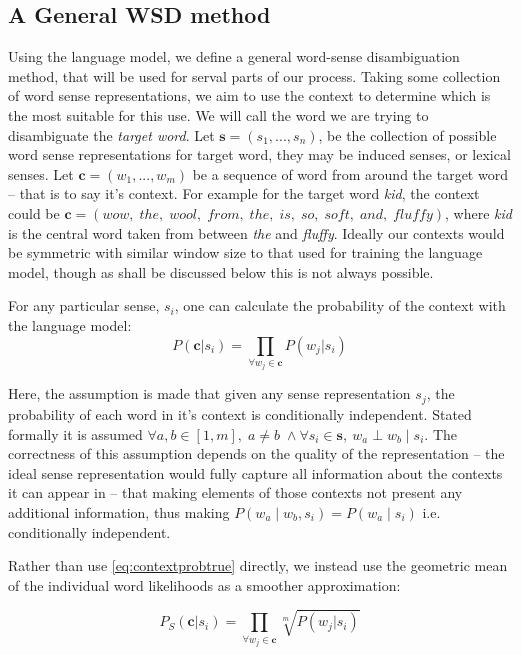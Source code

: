 \documentclass{sig-alternate}
\renewcommand{\c}{\mathbf{c}}
\begin{document}
\subsection{A General WSD method}
Using the language model, we define a general word-sense disambiguation method, that will be used for serval parts of our process.
Taking some collection of word sense representations, we aim to use the context to determine which is the most suitable for this use.
We will call the word we are trying to disambiguate the \emph{target word}.
Let $\mathbf{s}=(s_{1},...,s_{n})$, be the collection of possible word sense representations for target word, they may be induced senses, or lexical senses.
Let $\c=(w_{1},...,w_{m})$ be a sequence of word from around the target word -- that is to say it's context.
For example for the target word \emph{kid}, the context could be \mbox{$\c=(wow,\; the,\; wool,\; from,\; the,\; is,\; so,\; soft,\; and,\; fluffy)$}, where \emph{kid} is the central word taken from between \emph{the} and \emph{fluffy}.
Ideally our contexts would be symmetric with similar window size to that used for training the language model, though as shall be discussed below this is not always possible.
 
For any particular sense, $s_i$, one can calculate the probability of the context with the language model:
\begin{equation} \label{eq:contextprobtrue} P(\c|s_{i})=\prod_{\forall w_{j}\in\c}P(w_{j}|s_{i})
\end{equation}

Here, the assumption is made that given any sense representation $s_j$, the probability of each word in it's context is conditionally independent. Stated formally it is assumed $\forall a,b \in [1,m],\; a \ne b\; \wedge \forall s_i \in \mathbf{s},\:w_a \perp w_b \mid s_i$.
The correctness of this assumption depends on the quality of the representation -- the ideal sense representation would fully capture all information about the contexts it can appear in -- that making elements of those contexts not present any additional information, thus making $P(w_a \mid w_b,s_i)=P(w_a \mid s_i)$ i.e. conditionally independent.

Rather than use \cref{eq:contextprobtrue} directly, we instead use the geometric mean of the individual word likelihoods as a smoother approximation:

\begin{equation} \label{eq:contrextprobsmooth}
P_S(\c|s_{i})=\prod_{\forall w_{j}\in\c}\sqrt[m]{P(w_{j}|s_{i})}
\end{equation}
\end{document}
